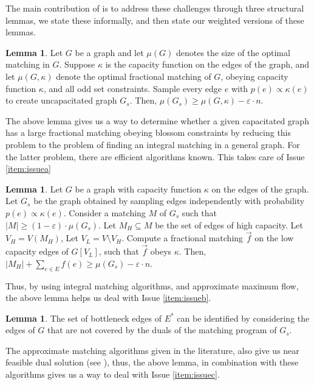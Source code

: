 \documentclass[a4paper,11pt]{article}
\newcommand{\card}[1]{|#1|}
\newcommand{\eps}{\varepsilon}
\theoremstyle{definition}
\theoremstyle{definition}
\theoremstyle{definition}
\theoremstyle{definition}
\theoremstyle{definition}
\newtheorem{lemma2}[definition2]{Lemma}
\theoremstyle{definition}
\theoremstyle{definition}
\theoremstyle{definition}
\theoremstyle{definition}
\theoremstyle{definition}
\theoremstyle{definition}
\theoremstyle{definition}
\theoremstyle{definition}
\theoremstyle{definition}
\theoremstyle{definition}
\begin{document}
The main contribution of \cite{AssadiBD22} is to address these challenges through three structural lemmas, we state these informally, and then state our weighted versions of these lemmas.

\begin{lemma2}\label{lem:detect}
Let $G$ be a graph and let $\mu(G)$ denotes the size of the optimal matching in $G$. Suppose $\kappa$ is the capacity function on the edges of the graph, and let $\mu(G,\kappa)$ denote the optimal fractional matching of $G$, obeying capacity function $\kappa$, and all odd set constraints. Sample every edge $e$ with $p(e) \propto \kappa(e)$ to create uncapacitated graph $G_s$. Then, $\mu(G_s)\geqslant \mu(G,\kappa)-\eps\cdot n$.
\end{lemma2}

The above lemma gives us a way to determine whether a given capacitated graph has a large fractional matching obeying blossom constraints by reducing this problem to the problem of finding an integral matching in a general graph. For the latter problem, there are efficient algorithms known. This takes care of Issue \ref{item:issuea}

\begin{lemma2}\label{lem:find}
Let $G$ be a graph with capacity function $\kappa$ on the edges of the graph. Let $G_s$ be the graph obtained by sampling edges independently with probability $p(e)\propto \kappa (e)$. Consider a matching $M$ of $G_s$ such that $\card{M}\geqslant (1-\eps)\cdot \mu(G_s)$. Let $M_H\subseteq M$ be the set of edges of high capacity. Let $V_H=V(M_H)$, Let $V_L=V\setminus V_H$. Compute a fractional matching $\vec{f}$ on the low capacity edges of $G[V_L]$, such that $\vec{f}$ obeys $\kappa$. Then, $\card{M_H}+\sum_{e\in E}f(e)\geqslant \mu(G_s)-\eps\cdot n$.
\end{lemma2}

Thus, by using integral matching algorithms, and approximate maximum flow, the above lemma helps us deal with Issue \ref{item:issueb}.

\begin{lemma2}\label{lem:increase}
The set of bottleneck edges of $E^*$ can be identified by considering the edges of $G$ that are not covered by the duals of the matching program of $G_s$. 
\end{lemma2}

The approximate matching algorithms given in the literature, also give us near feasible dual solution (see \cite{DP09}), thus, the above lemma, in combination with these algorithms gives us a way to deal with Issue \ref{item:issuec}. 
\end{document}
